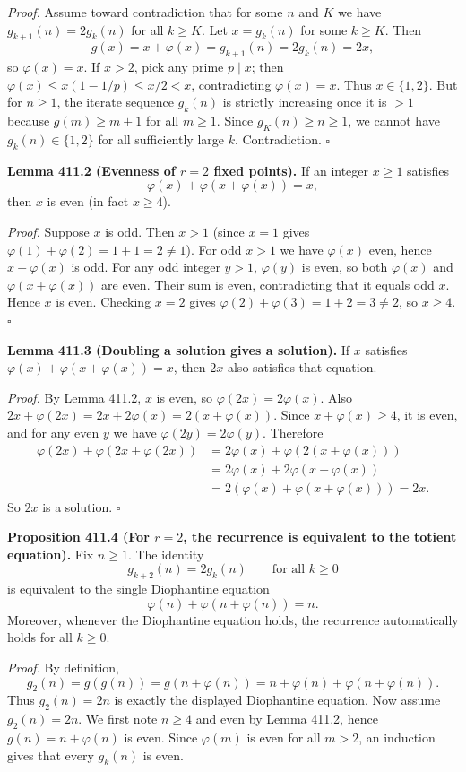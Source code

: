 \textit{Proof.}
Assume toward contradiction that for some $n$ and $K$ we have $g_{k+1}(n)=2g_k(n)$ for all $k\ge K$.
Let $x=g_k(n)$ for some $k\ge K$. Then
$$g(x)=x+\varphi(x)=g_{k+1}(n)=2g_k(n)=2x,$$
so $\varphi(x)=x$.
If $x>2$, pick any prime $p\mid x$; then $\varphi(x)\le x(1-1/p)\le x/2<x$, contradicting $\varphi(x)=x$.
Thus $x\in\{1,2\}$.
But for $n\ge1$, the iterate sequence $g_k(n)$ is strictly increasing once it is $>1$ because $g(m)\ge m+1$ for all $m\ge 1$.
Since $g_K(n)\ge n\ge 1$, we cannot have $g_k(n)\in\{1,2\}$ for all sufficiently large $k$.
Contradiction. \hfill$\square$

\textbf{Lemma 411.2 (Evenness of $r=2$ fixed points).}
If an integer $x\ge 1$ satisfies
\[
  \varphi(x)+\varphi(x+\varphi(x))=x,
\]
then $x$ is even (in fact $x\ge4$).

\textit{Proof.}
Suppose $x$ is odd.
Then $x>1$ (since $x=1$ gives $\varphi(1)+\varphi(2)=1+1=2\ne1$).
For odd $x>1$ we have $\varphi(x)$ even, hence $x+\varphi(x)$ is odd.
For any odd integer $y>1$, $\varphi(y)$ is even, so both $\varphi(x)$ and $\varphi(x+\varphi(x))$ are even.
Their sum is even, contradicting that it equals odd $x$.
Hence $x$ is even.
Checking $x=2$ gives $\varphi(2)+\varphi(3)=1+2=3\ne2$, so $x\ge4$. \hfill$\square$

\textbf{Lemma 411.3 (Doubling a solution gives a solution).}
If $x$ satisfies $\varphi(x)+\varphi(x+\varphi(x))=x$, then $2x$ also satisfies that equation.

\textit{Proof.}
By Lemma 411.2, $x$ is even, so $\varphi(2x)=2\varphi(x)$.
Also $2x+\varphi(2x)=2x+2\varphi(x)=2(x+\varphi(x))$.
Since $x+\varphi(x)\ge 4$, it is even, and for any even $y$ we have $\varphi(2y)=2\varphi(y)$.
Therefore
\begin{align*}
\varphi(2x)+\varphi(2x+\varphi(2x))
&=2\varphi(x)+\varphi(2(x+\varphi(x)))\\
&=2\varphi(x)+2\varphi(x+\varphi(x))\\
&=2( \varphi(x)+\varphi(x+\varphi(x)) )=2x.
\end{align*}
So $2x$ is a solution. \hfill$\square$

\textbf{Proposition 411.4 (For $r=2$, the recurrence is equivalent to the totient equation).}
Fix $n\ge1$.
The identity
$$g_{k+2}(n)=2g_k(n)\qquad\text{for all }k\ge 0$$
is equivalent to the single Diophantine equation
\[
  \varphi(n)+\varphi(n+\varphi(n))=n.
\]
Moreover, whenever the Diophantine equation holds, the recurrence automatically holds for all $k\ge0$.

\textit{Proof.}
By definition,
\[
  g_2(n)=g(g(n))=g(n+\varphi(n))=n+\varphi(n)+\varphi(n+\varphi(n)).
\]
Thus $g_2(n)=2n$ is exactly the displayed Diophantine equation.
Now assume $g_2(n)=2n$.
We first note $n\ge4$ and even by Lemma 411.2, hence $g(n)=n+\varphi(n)$ is even.
Since $\varphi(m)$ is even for all $m>2$, an induction gives that every $g_k(n)$ is even.

